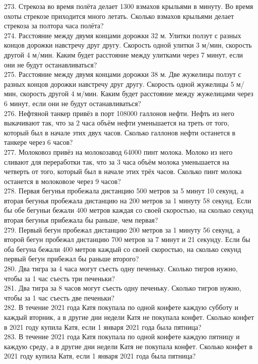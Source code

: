 273. Стрекоза во время полёта делает 1300 взмахов крыльями в минуту. Во время охоты стрекозе приходится много летать. Сколько взмахов крыльями делает стрекоза за полтора часа полёта?\\
274. Расстояние между двумя концами дорожки 32 м. Улитки ползут с разных концов дорожки навстречу друг другу. Скорость одной улитки 3 м/мин, скорость другой 4 м/мин. Каким будет расстояние между улитками через 7 минут, если они не будут останавливаться?\\
275. Расстояние между двумя концами дорожки 38 м. Две жужелицы ползут с разных концов дорожки навстречу друг другу. Скорость одной жужелицы 5 м/мин, скорость другой 4 м/мин. Каким будет расстояние между жужелицами через 6 минут, если они не будут останавливаться?\\
276. Нефтяной танкер привёз в порт 108000 галлонов нефти. Нефть из него выкачивают так, что за 2 часа объём нефти уменьшается на треть от того, который был в начале этих двух часов. Сколько галлонов нефти останется в танкере через 6 часов?\\
277. Молоковоз привёз на молокозавод 64000 пинт молока. Молоко из него сливают для переработки так, что за 3 часа объём молока уменьшается на четверть от того, который был в начале этих трёх часов. Сколько пинт молока останется в молоковозе через 9 часов?\\
278. Первая бегунья пробежала дистанцию 500 метров за 5 минут 10 секунд, а вторая бегунья пробежала дистанцию на 200 метров за 1 минуту 58 секунд. Если бы обе бегуньи бежали 400 метров каждая со своей скоростью, на сколько секунд вторая бегунья прибежала бы раньше, чем первая?\\
279. Первый бегун пробежал дистанцию 200 метров за 1 минуту 56 секунд, а второй бегун пробежал дистанцию 700 метров за 7 минут и 21 секунду. Если бы оба бегуна бежали 400 метров каждый со своей скоростью, на сколько секунд первый бегун прибежал бы раньше второго?\\
280. Два тигра за 4 часа могут съесть одну печеньку. Сколько тигров нужно, чтобы за 1 час съесть три печеньки?\\
281. Два тигра за 8 часов могут съесть одну печеньку. Сколько тигров нужно, чтобы за 1 час съесть две печеньки?\\
282. В течение 2021 года Катя покупала по одной конфете каждую субботу и каждый вторник, а в другие дни недели Катя не покупала конфет. Сколько конфет в 2021 году купила Катя, если 1 января 2021 года была пятница?\\
283. В течение 2021 года Катя покупала по одной конфете каждую пятницу и каждую среду, а в другие дни недели Катя не покупала конфет. Сколько конфет в 2021 году купила Катя, если 1 января 2021 года была пятница?\\
